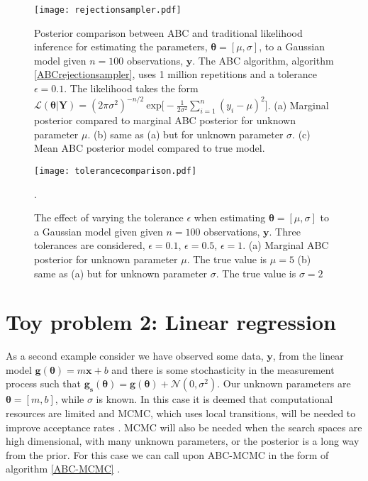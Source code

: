 \begin{figure}[H]
	\centering
	\texttt{[image: rejectionsampler.pdf]}
	\caption{Posterior comparison between ABC and traditional likelihood inference for estimating the parameters, $\bm{\theta} = [\mu,\sigma]$, to a Gaussian model given $n = 100$ observations, $\bm{y}$. The ABC algorithm, algorithm \ref{ABCrejectionsampler}, uses 1 million repetitions and a tolerance $\epsilon = 0.1$. The likelihood takes the form $\mathcal{L}(\bm{\theta}|\bm{Y}) = (2\pi\sigma^2)^{-n/2}\ \text{exp}\big[-\frac{1}{2\sigma^2}\sum_{i = 1}^{n}(y_i-\mu)^2\big]$. (a) Marginal posterior compared to marginal ABC posterior for unknown parameter $\mu$. (b) same as (a) but for unknown parameter $\sigma$. (c) Mean ABC posterior model compared to true model.}
	\label{toy1-fig1}
\end{figure}

\begin{figure}[H]
	\centering
	\texttt{[image: tolerancecomparison.pdf]}
	\caption{The effect of varying the tolerance $\epsilon$ when estimating $\bm{\theta} = [\mu,\sigma]$ to a Gaussian model given given $n = 100$ observations, $\bm{y}$. Three tolerances are considered, $\epsilon = 0.1$, $\epsilon = 0.5$, $\epsilon = 1$. (a) Marginal ABC posterior for unknown parameter $\mu$. The true value is $\mu = 5$ (b) same as (a) but for unknown parameter $\sigma$. The true value is $\sigma = 2$}.
	\label{toy1-fig2}
\end{figure}

\section{Toy problem 2: Linear regression}
\label{sec-lin-reg}

As a second example consider we have observed some data, $\bm{y}$, from the linear model $\bm{g}(\bm{\theta}) = m\bm{x} + b$ and there is some stochasticity in the measurement process such that $\bm{g_s}(\bm{\theta}) = \bm{g}(\bm{\theta}) + \mathcal{N}(0,\sigma^2)$. Our unknown parameters are $\bm{\theta} = [m,b]$, while $\sigma$ is known. In this case it is deemed that computational resources are limited and MCMC, which uses local transitions, will be needed to improve acceptance rates \citep{Gilks1995}. MCMC will also be needed when the search spaces are high dimensional, with many unknown parameters, or the posterior is a long way from the prior. For this case we can call upon ABC-MCMC in the form of algorithm \ref{ABC-MCMC} \citep{Marjoram2003,Sisson2010a}. \par

